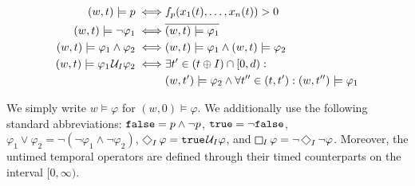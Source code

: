 \small
\begin{align*}
	(w,t) \models p \iff & f_p(x_1(t), \ldots, x_n(t)) > 0 \\
	(w,t) \models \lnot \varphi_1 \iff & \overline{(w,t) \models \varphi_1} \\
	(w,t) \models \varphi_1 \land \varphi_2 \iff & (w,t) \models \varphi_1 \land (w,t) \models \varphi_2 \\
	(w,t) \models \varphi_1 \kern.1em\mathcal{U}_I \varphi_2 \iff & \exists t' \in (t \oplus I) \cap [0,d) :  \\
	& (w,t') \models \varphi_2 \land \forall t'' \in (t, t') : (w,t'') \models \varphi_1
\end{align*}
\normalsize

We simply write $w \models \varphi$ for $(w,0) \models \varphi$.
We additionally use the following standard abbreviations: 
$\texttt{false} = p \land \lnot p$,
$\texttt{true} = \lnot \texttt{false}$,
$ \varphi_1 \lor \varphi_2 = \lnot (\lnot \varphi_1 \land \lnot \varphi_2)$,
$\LTLf_I \varphi = \true \until_I \varphi$, and
$\LTLg_I \varphi = \lnot \LTLf_I \lnot \varphi$.
Moreover, the untimed temporal operators are defined through their timed counterparts on the interval $[0,\infty)$.



